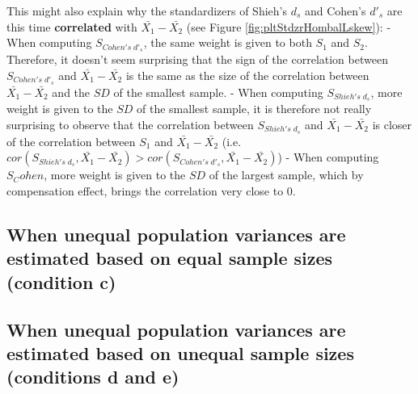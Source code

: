 \documentclass[
  man]{apa6}
\begin{document}
This might also explain why the standardizers of Shieh's \(d_s\) and Cohen's \(d'_s\) are this time \textbf{correlated} with \(\bar{X_1}-\bar{X_2}\) (see Figure \ref{fig:pltStdzrHombalLskew}):
- When computing \(S_{Cohen's \; d'_s}\), the same weight is given to both \(S_1\) and \(S_2\). Therefore, it doesn't seem surprising that the sign of the correlation between \(S_{Cohen's \; d'_s}\) and \(\bar{X_1}-\bar{X_2}\) is the same as the size of the correlation between \(\bar{X_1}-\bar{X_2}\) and the \(SD\) of the smallest sample.
- When computing \(S_{Shieh's \; d_s}\), more weight is given to the \(SD\) of the smallest sample, it is therefore not really surprising to observe that the correlation between \(S_{Shieh's \; d_s}\) and \(\bar{X_1}-\bar{X_2}\) is closer of the correlation between \(S_1\) and \(\bar{X_1}-\bar{X_2}\) (i.e.~\(cor(S_{Shieh's \; d_s},\bar{X_1}-\bar{X_2}) > cor(S_{Cohen's \; d'_s},\bar{X_1}-\bar{X_2})\))
- When computing \(S_Cohen\), more weight is given to the \(SD\) of the largest sample, which by compensation effect, brings the correlation very close to 0.

\hypertarget{when-unequal-population-variances-are-estimated-based-on-equal-sample-sizes-condition-c}{%
\subsection{When unequal population variances are estimated based on equal sample sizes (condition c)}\label{when-unequal-population-variances-are-estimated-based-on-equal-sample-sizes-condition-c}}

\hypertarget{when-unequal-population-variances-are-estimated-based-on-unequal-sample-sizes-conditions-d-and-e}{%
\subsection{When unequal population variances are estimated based on unequal sample sizes (conditions d and e)}\label{when-unequal-population-variances-are-estimated-based-on-unequal-sample-sizes-conditions-d-and-e}}
\end{document}
